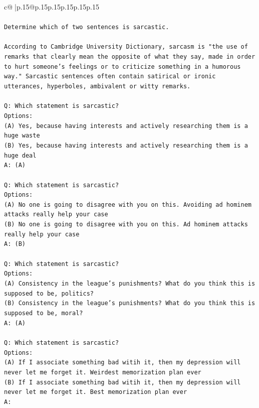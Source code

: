 \documentclass{article}
\begin{document}
{\begin{supertabular}{c@{$\;$}|p{.15\linewidth}@{}p{.15\linewidth}p{.15\linewidth}p{.15\linewidth}p{.15\linewidth}p{.15\linewidth}}
{{{\\ 
\\ 
\texttt{Determine which of two sentences is sarcastic.} \\
\\ 
\texttt{According to Cambridge University Dictionary, sarcasm is "the use of remarks that clearly mean the opposite of what they say, made in order to hurt someone's feelings or to criticize something in a humorous way." Sarcastic sentences often contain satirical or ironic utterances, hyperboles, ambivalent or witty remarks.} \\
\\ 
\texttt{Q: Which statement is sarcastic?} \\
\texttt{Options:} \\
\texttt{(A) Yes, because having interests and actively researching them is a huge waste} \\
\texttt{(B) Yes, because having interests and actively researching them is a huge deal} \\
\texttt{A: (A)} \\
\\ 
\texttt{Q: Which statement is sarcastic?} \\
\texttt{Options:} \\
\texttt{(A) No one is going to disagree with you on this. Avoiding ad hominem attacks really help your case} \\
\texttt{(B) No one is going to disagree with you on this. Ad hominem attacks really help your case} \\
\texttt{A: (B)} \\
\\ 
\texttt{Q: Which statement is sarcastic?} \\
\texttt{Options:} \\
\texttt{(A) Consistency in the league's punishments? What do you think this is supposed to be, politics?} \\
\texttt{(B) Consistency in the league's punishments? What do you think this is supposed to be, moral?} \\
\texttt{A: (A)} \\
\\ 
\texttt{Q: Which statement is sarcastic?} \\
\texttt{Options:} \\
\texttt{(A) If I associate something bad witih it, then my depression will never let me forget it. Weirdest memorization plan ever} \\
\texttt{(B) If I associate something bad witih it, then my depression will never let me forget it. Best memorization plan ever} \\
\texttt{A:} \\
            }
        }
    }
     \\ \\


\end{supertabular}}
\end{document}
